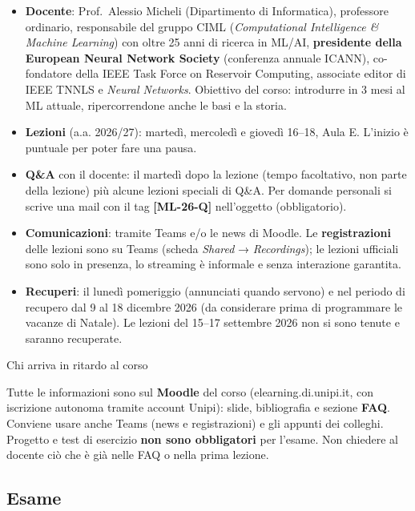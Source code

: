 \begin{itemize}
\tightlist
\item
  \textbf{Docente}: Prof.~Alessio Micheli (Dipartimento di Informatica),
  professore ordinario, responsabile del gruppo CIML
  (\emph{Computational Intelligence \& Machine Learning}) con oltre 25
  anni di ricerca in ML/AI, \textbf{presidente della European Neural
  Network Society} (conferenza annuale ICANN), co-fondatore della IEEE
  Task Force on Reservoir Computing, associate editor di IEEE TNNLS e
  \emph{Neural Networks}. Obiettivo del corso: introdurre in 3 mesi al
  ML attuale, ripercorrendone anche le basi e la storia.
\item
  \textbf{Lezioni} (a.a. 2026/27): martedì, mercoledì e giovedì 16--18,
  Aula E. L'inizio è puntuale per poter fare una pausa.
\item
  \textbf{Q\&A} con il docente: il martedì dopo la lezione (tempo
  facoltativo, non parte della lezione) più alcune lezioni speciali di
  Q\&A. Per domande personali si scrive una mail con il tag
  \textbf{{[}ML-26-Q{]}} nell'oggetto (obbligatorio).
\item
  \textbf{Comunicazioni}: tramite Teams e/o le news di Moodle. Le
  \textbf{registrazioni} delle lezioni sono su Teams (scheda
  \emph{Shared} → \emph{Recordings}); le lezioni ufficiali sono solo in
  presenza, lo streaming è informale e senza interazione garantita.
\item
  \textbf{Recuperi}: il lunedì pomeriggio (annunciati quando servono) e
  nel periodo di recupero dal 9 al 18 dicembre 2026 (da considerare
  prima di programmare le vacanze di Natale). Le lezioni del 15--17
  settembre 2026 non si sono tenute e saranno recuperate.
\end{itemize}

\begin{boxnote}{Chi arriva in ritardo al corso}

Tutte le informazioni sono sul \textbf{Moodle} del corso
(elearning.di.unipi.it, con iscrizione autonoma tramite account Unipi):
slide, bibliografia e sezione \textbf{FAQ}. Conviene usare anche Teams
(news e registrazioni) e gli appunti dei colleghi. Progetto e test di
esercizio \textbf{non sono obbligatori} per l'esame. Non chiedere al
docente ciò che è già nelle FAQ o nella prima lezione.

\end{boxnote}

\subsection{Esame}\label{esame}


